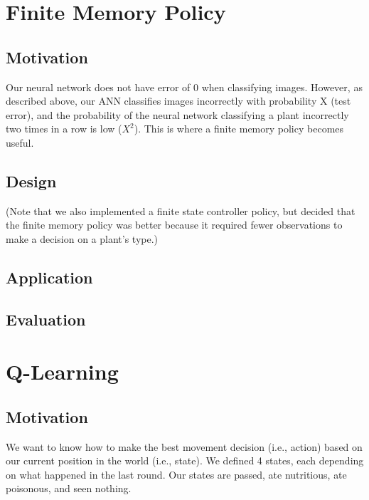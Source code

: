 \documentclass[solution, letterpaper]{cs121}
\begin{document}
\section{Finite Memory Policy}
\subsection{Motivation}
\hspace{4mm} Our neural network does not have error of 0 when classifying images. However, as described above, our ANN classifies images incorrectly with probability X (test error), and the probability of the neural network classifying a plant incorrectly two times in a row is low ($X^2$). This is where a finite memory policy becomes useful.

\subsection{Design}

(Note that we also implemented a finite state controller policy, but decided that the finite memory policy was better because it required fewer observations to make a decision on a plant's type.)
\subsection{Application}
\subsection{Evaluation}

\section{Q-Learning}
\subsection{Motivation}
We want to know how to make the best movement decision (i.e., action) based on our current position in the world (i.e., state). We defined 4 states, each depending on what happened in the last round. Our states are {\sc passed}, {\sc ate nutritious}, {\sc ate poisonous}, and {\sc seen nothing}.
\end{document}
